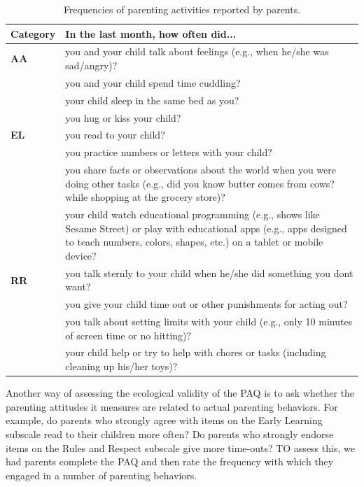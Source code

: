 \documentclass[floatsintext,man]{apa6}
\theoremstyle{definition}
\theoremstyle{definition}
\theoremstyle{definition}
\theoremstyle{remark}
\begin{document}
\begin{table}[!h]

\caption{\label{tab:behavesents}Frequencies of parenting activities reported by parents.}
\centering
\fontsize{9}{11}\selectfont
\begin{tabular}[t]{>{\bfseries}l>{\raggedright\arraybackslash}p{40em}}
\toprule
Category & In the last month, how often did...\\
\midrule
AA & you and your child talk about feelings (e.g., when he/she was sad/angry)?\\
 & you and your child spend time cuddling?\\
 & your child sleep in the same bed as you?\\
 & you hug or kiss your child?\\
EL & you read to your child?\\
\addlinespace
 & you practice numbers or letters with your child?\\
 & you share facts or observations about the world when you were doing other tasks (e.g., did you know butter comes from cows? while shopping at the grocery store)?\\
 & your child watch educational programming (e.g., shows like Sesame Street) or play with educational apps (e.g., apps designed to teach numbers, colors, shapes, etc.) on a tablet or mobile device?\\
RR & you talk sternly to your child when he/she did something you dont want?\\
 & you give your child time out or other punishments for acting out?\\
\addlinespace
 & you talk about setting limits with your child (e.g., only 10 minutes of screen time or no hitting)?\\
 & your child help or try to help with chores or tasks (including cleaning up his/her toys)?\\
\bottomrule
\end{tabular}
\end{table}

Another way of assessing the ecological validity of the PAQ is to ask
whether the parenting attitudes it measures are related to actual
parenting behaviors. For example, do parents who strongly agree with
items on the Early Learning subscale read to their children more often?
Do parents who strongly endorse items on the Rules and Respect subscale
give more time-outs? TO assess this, we had parents complete the PAQ and
then rate the frequency with which they engaged in a number of parenting
behaviors.
\end{document}
